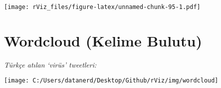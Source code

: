 \documentclass[
]{book}
\newenvironment{Shaded}{\begin{snugshade}}{\end{snugshade}}
\newcommand{\CommentTok}[1]{\textcolor[rgb]{0.56,0.35,0.01}{\textit{#1}}}
\newcommand{\DataTypeTok}[1]{\textcolor[rgb]{0.13,0.29,0.53}{#1}}
\newcommand{\DecValTok}[1]{\textcolor[rgb]{0.00,0.00,0.81}{#1}}
\newcommand{\FloatTok}[1]{\textcolor[rgb]{0.00,0.00,0.81}{#1}}
\newcommand{\KeywordTok}[1]{\textcolor[rgb]{0.13,0.29,0.53}{\textbf{#1}}}
\newcommand{\NormalTok}[1]{#1}
\newcommand{\OperatorTok}[1]{\textcolor[rgb]{0.81,0.36,0.00}{\textbf{#1}}}
\newcommand{\StringTok}[1]{\textcolor[rgb]{0.31,0.60,0.02}{#1}}
\begin{document}
\texttt{[image: rViz\_files/figure-latex/unnamed-chunk-95-1.pdf]}

\hypertarget{wordcloud-kelime-bulutu}{%
\section{Wordcloud (Kelime Bulutu)}\label{wordcloud-kelime-bulutu}}

\emph{Türkçe atılan `virüs' tweetleri:}

\begin{Shaded}
\end{Shaded}

\texttt{[image: C:/Users/datanerd/Desktop/Github/rViz/img/wordcloud]}

  
\end{document}

